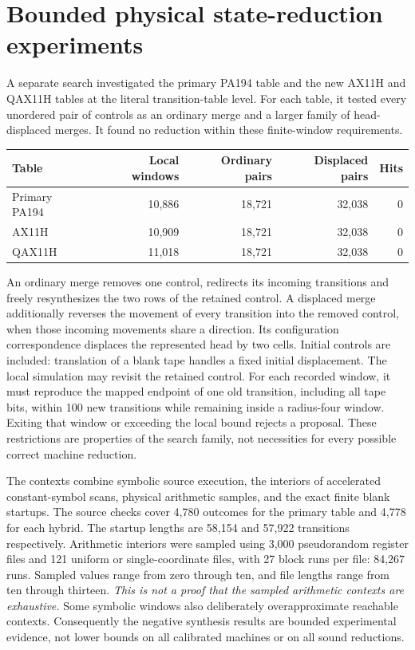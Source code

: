 \section{Bounded physical state-reduction experiments}
\label{sec:physical-search}

A separate search investigated the primary PA194 table and the new
AX11H and QAX11H tables at the literal transition-table level.
For each table, it tested every unordered pair of controls as an ordinary
merge and a larger family of head-displaced merges. It found no reduction
within these finite-window requirements.

\begin{center}
\begin{tabular}{lrrrr}
\hline
Table & Local windows & Ordinary pairs & Displaced pairs & Hits\\
\hline
Primary PA194 & 10,886 & 18,721 & 32,038 & 0\\
AX11H & 10,909 & 18,721 & 32,038 & 0\\
QAX11H & 11,018 & 18,721 & 32,038 & 0\\
\hline
\end{tabular}
\end{center}

An ordinary merge removes one control, redirects its incoming transitions
and freely resynthesizes the two rows of the retained control. A displaced
merge additionally reverses the movement of every transition into the
removed control, when those incoming movements share a direction. Its
configuration correspondence displaces the represented head by two cells.
Initial controls are included: translation of a blank tape handles a fixed
initial displacement. The local simulation may revisit the retained control.
For each recorded window, it must reproduce the mapped endpoint of one old
transition, including all tape bits, within 100 new transitions while
remaining inside a radius-four window. Exiting that window or exceeding the
local bound rejects a proposal. These restrictions are properties of the
search family, not necessities for every possible correct machine reduction.

The contexts combine symbolic source execution, the interiors of accelerated
constant-symbol scans, physical arithmetic samples, and the exact finite
blank startups. The source checks cover 4,780 outcomes for the primary table
and 4,778 for each hybrid. The startup lengths are 58,154 and 57,922
transitions respectively. Arithmetic interiors were sampled using 3,000
pseudorandom register files and 121 uniform or single-coordinate files,
with 27 block runs per file: 84,267 runs. Sampled values range from zero
through ten, and file lengths range from ten through thirteen.
\emph{This is not a proof that the sampled arithmetic contexts are exhaustive.}
Some symbolic windows also deliberately overapproximate reachable contexts.
Consequently the negative synthesis results are bounded experimental evidence,
not lower bounds on all calibrated machines or on all sound reductions.

